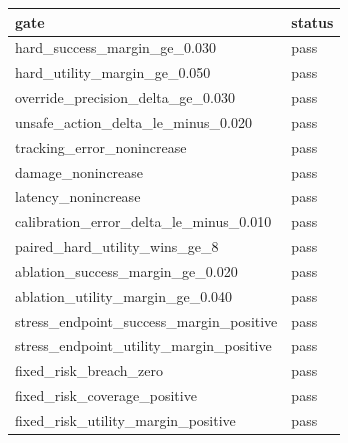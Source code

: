 \begin{tabular}{ll}
\toprule
gate & status \\
\midrule
hard\_success\_margin\_ge\_0.030 & pass \\
hard\_utility\_margin\_ge\_0.050 & pass \\
override\_precision\_delta\_ge\_0.030 & pass \\
unsafe\_action\_delta\_le\_minus\_0.020 & pass \\
tracking\_error\_nonincrease & pass \\
damage\_nonincrease & pass \\
latency\_nonincrease & pass \\
calibration\_error\_delta\_le\_minus\_0.010 & pass \\
paired\_hard\_utility\_wins\_ge\_8 & pass \\
ablation\_success\_margin\_ge\_0.020 & pass \\
ablation\_utility\_margin\_ge\_0.040 & pass \\
stress\_endpoint\_success\_margin\_positive & pass \\
stress\_endpoint\_utility\_margin\_positive & pass \\
fixed\_risk\_breach\_zero & pass \\
fixed\_risk\_coverage\_positive & pass \\
fixed\_risk\_utility\_margin\_positive & pass \\
\bottomrule
\end{tabular}

